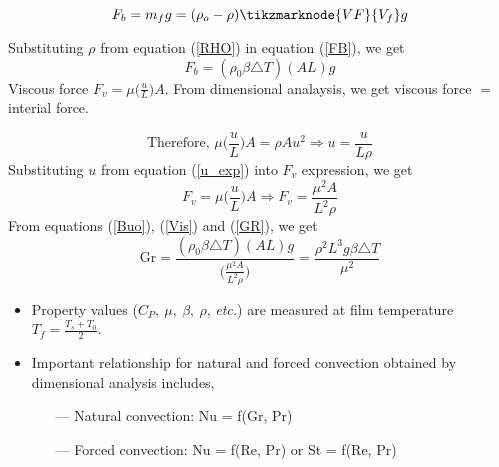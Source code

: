 \documentclass[a4paper, 12 pt]{article}
\begin{document}
\begin{enumerate}
    \begin{equation}\label{FB}
        F_b=m_fg=(\rho _o - \rho)\tikzmarknode{VF}{V_f}g
    \end{equation}
    Substituting $\rho$ from equation (\ref{RHO}) in equation (\ref{FB}), we get
    \begin{equation}\label{Buo}
        F_b=(\rho _0 \beta \triangle T)(AL)g
    \end{equation}
    Viscous force $F_v = \mu \big(\frac{u}{L} \big)A$. From dimensional analaysis, we get viscous force $=$ interial force.

    \begin{equation}\label{u_exp}
       \text{Therefore, }  \mu \big(\frac{u}{L} \big)A = \rho A u^2 \Rightarrow u = \frac{u}{L\rho}
    \end{equation}
    Substituting $u$ from equation (\ref{u_exp}) into $F_v$ expression, we get
    \begin{equation}\label{Vis}
        F_v = \mu \big(\frac{u}{L} \big)A \Rightarrow F_v = \frac{\mu ^ 2 A}{L^2\rho}
    \end{equation}
    From equations (\ref{Buo}), (\ref{Vis}) and (\ref{GR}), we get
    \begin{equation}
        \boxed{\text{Gr}=\frac{(\rho _0 \beta \triangle T)(AL)g}{\bigg( \frac{\mu ^ 2 A}{L^2\rho} \bigg)}=\frac{\rho^2L^3g\beta \triangle T}{\mu^2}}
    \end{equation}
    \begin{itemize}
        \item Property values ($C_P,\ \mu,\ \beta, \ \rho$, \textit{etc.}) are measured at film temperature $T_f=\frac{T_s+T_0}{2}$.
        
        \item Important relationship for natural and forced convection obtained by dimensional analysis includes, 
        
        \begin{itemize}
            \item[---] Natural convection: Nu = f(Gr, Pr)
            \item[---] Forced convection: Nu = f(Re, Pr) or St = f(Re, Pr)
        \end{itemize}
        

\end{itemize}
\end{enumerate}
\end{document}
